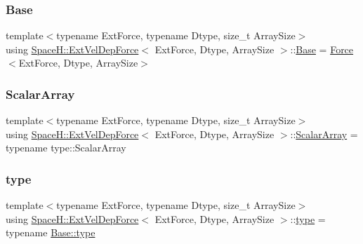\subsubsection{\texorpdfstring{Base}{Base}}
{\footnotesize\ttfamily template$<$typename Ext\+Force, typename Dtype, size\+\_\+t Array\+Size$>$ \\
using \mbox{\hyperlink{struct_space_h_1_1_ext_vel_dep_force}{Space\+H\+::\+Ext\+Vel\+Dep\+Force}}$<$ Ext\+Force, Dtype, Array\+Size $>$\+::\mbox{\hyperlink{struct_space_h_1_1_ext_vel_dep_force_a92ddc0ad1001e17ef8b4f870be20cada}{Base}} =  \mbox{\hyperlink{struct_space_h_1_1_force}{Force}}$<$Ext\+Force, Dtype, Array\+Size$>$}

\mbox{\label{struct_space_h_1_1_ext_vel_dep_force_afb0d9418e7236855d8cd8ce883493c27}} 
\subsubsection{\texorpdfstring{Scalar\+Array}{ScalarArray}}
{\footnotesize\ttfamily template$<$typename Ext\+Force, typename Dtype, size\+\_\+t Array\+Size$>$ \\
using \mbox{\hyperlink{struct_space_h_1_1_ext_vel_dep_force}{Space\+H\+::\+Ext\+Vel\+Dep\+Force}}$<$ Ext\+Force, Dtype, Array\+Size $>$\+::\mbox{\hyperlink{struct_space_h_1_1_ext_vel_dep_force_afb0d9418e7236855d8cd8ce883493c27}{Scalar\+Array}} =  typename type\+::\+Scalar\+Array}

\mbox{\label{struct_space_h_1_1_ext_vel_dep_force_ace51228267cd84b498bef72f6a06b727}} 
\subsubsection{\texorpdfstring{type}{type}}
{\footnotesize\ttfamily template$<$typename Ext\+Force, typename Dtype, size\+\_\+t Array\+Size$>$ \\
using \mbox{\hyperlink{struct_space_h_1_1_ext_vel_dep_force}{Space\+H\+::\+Ext\+Vel\+Dep\+Force}}$<$ Ext\+Force, Dtype, Array\+Size $>$\+::\mbox{\hyperlink{struct_space_h_1_1_ext_vel_dep_force_ace51228267cd84b498bef72f6a06b727}{type}} =  typename \mbox{\hyperlink{struct_space_h_1_1_force_a151c6ae1ec7ad87825c2b6cc74aee5f2}{Base\+::type}}}

